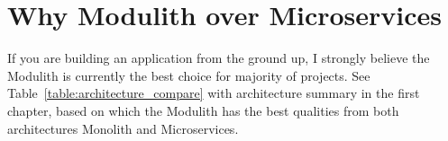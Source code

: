 


\section{Why Modulith over Microservices}
\label{section:building_new_app}
If you are building an application from the ground up, I strongly believe the Modulith is currently the best choice for majority of projects. See Table~\ref{table:architecture_compare} with architecture summary in the first chapter, based on which the Modulith has the best qualities from both architectures Monolith and Microservices. 

